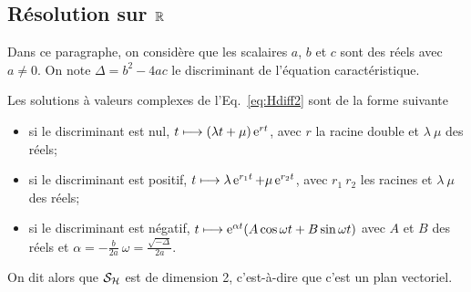 \subsection{Résolution sur $\mathbb{R}$}
\label{subsec:resR}
Dans ce paragraphe, on considère que les scalaires $a$, $b$ et $c$ sont des réels avec $a \neq 0$. On note $\Delta=b^2-4ac$ le discriminant de l'équation caractéristique.
\begin{theo}
  \label{theo:6} 
  Les solutions à valeurs complexes de l'Eq.~\eqref{eq:Hdiff2} sont de la forme suivante
  \begin{itemize}
  \item si le discriminant est nul, $t \longmapsto (\lambda t + \mu)\operatorname{e}^{rt}$, avec $r$ la racine double et $\lambda \ \mu$ des réels;
  \item si le discriminant est positif, $t \longmapsto \lambda \operatorname{e}^{r_1 t} + \mu \operatorname{e}^{r_2 t}$, avec $r_1 \ r_2$ les racines et $\lambda \ \mu$ des réels;
  \item si le discriminant est négatif, $t \longmapsto \operatorname{e}^{\alpha t} (A \cos \omega t + B \sin \omega t)$ avec $A$ et $B$ des réels et $\alpha=-\frac{b}{2a} \ \omega = \frac{\sqrt{-\Delta}}{2a}$.
  \end{itemize}
  On dit alors que $\mathcal{S}_{\mathcal{H}}$ est de dimension 2, c'est-à-dire que c'est un plan vectoriel.
\end{theo}
